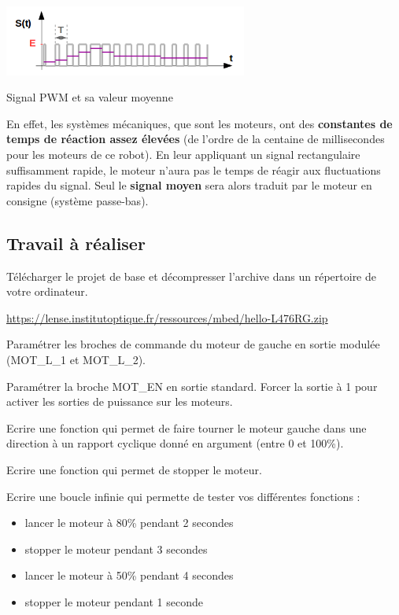 \documentclass[a4paper,11pt,titlepage]{article} %
\begin{document}
\begin{center}
	\includegraphics[width=0.6\textwidth]{images/MINE_ElecNum_PWM_Signal.png}
	
	Signal PWM et sa valeur moyenne
\end{center}


En effet, les systèmes mécaniques, que sont les moteurs, ont des \textbf{constantes de temps de réaction assez élevées} (de l'ordre de la centaine de millisecondes pour les moteurs de ce robot). En leur appliquant un signal rectangulaire suffisamment rapide, le moteur n'aura pas le temps de réagir aux fluctuations rapides du signal. Seul le \textbf{signal moyen} sera alors traduit par le moteur en consigne (système passe-bas).


\newpage
\subsection{Travail à réaliser}

\Manip Télécharger le projet de base et décompresser l'archive dans un répertoire de votre ordinateur.

\href{https://lense.institutoptique.fr/ressources/mbed/hello-L476RG.zip}{https://lense.institutoptique.fr/ressources/mbed/hello-L476RG.zip}

\Manip Paramétrer les broches de commande du moteur de gauche en sortie modulée (\textsc{MOT\_L\_1} et \textsc{MOT\_L\_2}). 

\Manip Paramétrer la broche \textsc{MOT\_EN} en sortie standard. Forcer la sortie à 1 pour activer les sorties de puissance sur les moteurs.

\Manip Ecrire une fonction qui permet de faire tourner le moteur gauche dans une direction à un rapport cyclique donné en argument (entre 0 et 100\%).

\Manip Ecrire une fonction qui permet de stopper le moteur.

\Manip Ecrire une boucle infinie qui permette de tester vos différentes fonctions :

\begin{itemize}
	\item lancer le moteur à 80\% pendant 2 secondes
	\item stopper le moteur pendant 3 secondes
	\item lancer le moteur à 50\% pendant 4 secondes
	\item stopper le moteur pendant 1 seconde
\end{itemize}
\end{document}
